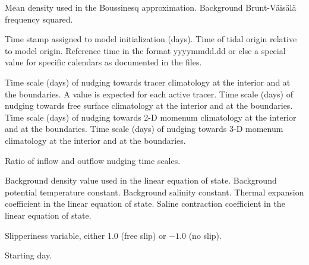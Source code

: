 \begin{klist}
\begin{klist}
            Mean density used in the Boussinesq
     approximation.
        Background Brunt-V\"ais\"al\"a frequency squared.
     \end{klist}
    \mbox{}
     \begin{klist}
          Time stamp assigned to model initialization
     (days).
          Time of tidal origin relative to model
       origin.
         Reference time in the format yyyymmdd.dd or
       else a special value for specific calendars as documented in the
        files.
     \end{klist}
   \mbox{}
     \begin{klist}
           Time scale (days) of nudging towards
     tracer climatology at the interior and at the boundaries.
     A value is expected for each active tracer.
           Time scale (days) of nudging towards
     free surface climatology at the interior and at the boundaries.
           Time scale (days) of nudging towards
     2-D momenum climatology at the interior and at the boundaries.
           Time scale (days) of nudging towards
     3-D momenum climatology at the interior and at the boundaries.
     \end{klist}
    \mbox{}
     \begin{klist}
          Ratio of inflow and outflow nudging time scales.
     \end{klist}
    \mbox{}
     \begin{klist}
              Background density value used in
    the linear equation of state.
              Background potential temperature constant.
              Background salinity constant.
           Thermal expansion coefficient in the linear
    equation of state.
           Saline contraction coefficient in the linear
    equation of state.
     \end{klist}
    \mbox{}
     \begin{klist}
          Slipperiness variable, either 1.0 (free
     slip) or $-1.0$ (no slip).
     \end{klist}
    \mbox{}
     \begin{klist}
        Starting day.

\end{klist}
\end{klist}
